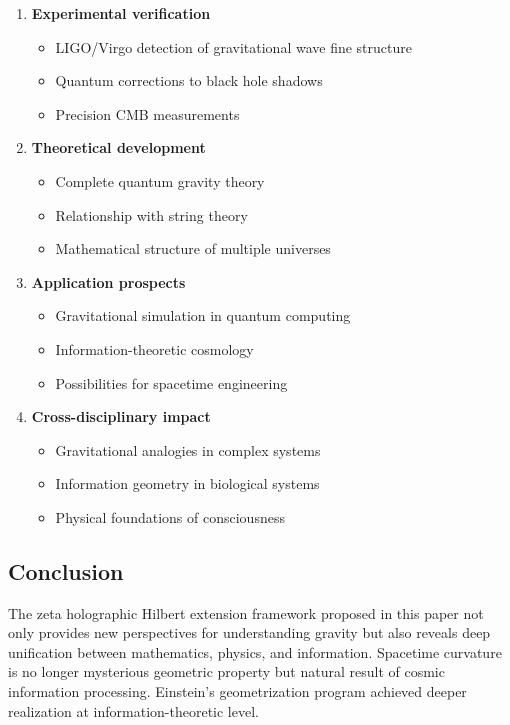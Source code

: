 \documentclass[12pt,a4paper]{article}
\begin{document}
\begin{enumerate}
\item \textbf{Experimental verification}
   \begin{itemize}
   \item LIGO/Virgo detection of gravitational wave fine structure
   \item Quantum corrections to black hole shadows
   \item Precision CMB measurements
   \end{itemize}

\item \textbf{Theoretical development}
   \begin{itemize}
   \item Complete quantum gravity theory
   \item Relationship with string theory
   \item Mathematical structure of multiple universes
   \end{itemize}

\item \textbf{Application prospects}
   \begin{itemize}
   \item Gravitational simulation in quantum computing
   \item Information-theoretic cosmology
   \item Possibilities for spacetime engineering
   \end{itemize}

\item \textbf{Cross-disciplinary impact}
   \begin{itemize}
   \item Gravitational analogies in complex systems
   \item Information geometry in biological systems
   \item Physical foundations of consciousness
   \end{itemize}
\end{enumerate}

\subsection{Conclusion}

The zeta holographic Hilbert extension framework proposed in this paper not only provides new perspectives for understanding gravity but also reveals deep unification between mathematics, physics, and information. Spacetime curvature is no longer mysterious geometric property but natural result of cosmic information processing. Einstein's geometrization program achieved deeper realization at information-theoretic level.
\end{document}
